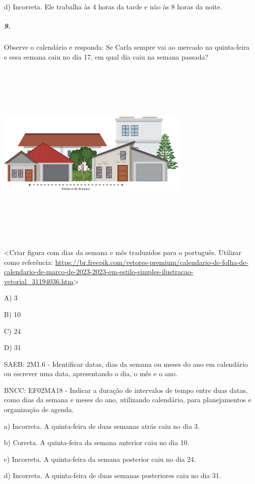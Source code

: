 d) Incorreta. Ele trabalha às 4 horas da tarde e não às 8 horas da
noite.

\subparagraph{9. }\label{section-108}

Observe o calendário e responda: Se Carla sempre vai ao mercado na
quinta-feira e essa semana caiu no dia 17, em qual dia caiu na semana
passada?

\includegraphics[width=3.68590in,height=3.59375in]{media/image117.png}

\textless{}Criar figura com dias da semana e mês traduzidos para o
português. Utilizar como referência:
\url{https://br.freepik.com/vetores-premium/calendario-de-folha-de-calendario-de-marco-de-2023-2023-em-estilo-simples-ilustracao-vetorial_31194036.htm}\textgreater{}

A) 3

B) 10

C) 24

D) 31

SAEB: 2M1.6 - Identificar datas, dias da semana ou meses do ano em
calendário ou escrever uma data, apresentando o dia, o mês e o ano.

BNCC: EF02MA18 - Indicar a duração de intervalos de tempo entre duas
datas, como dias da semana e meses do ano, utilizando calendário, para
planejamentos e organização de agenda.

a) Incorreta. A quinta-feira de duas semanas atrás caiu no dia 3.

b) Correta. A quinta-feira da semana anterior caiu no dia 10.

c) Incorreta. A quinta-feira da semana posterior caiu no dia 24.

d) Incorreta. A quinta-feira de duas semanas posteriores caiu no dia 31.

